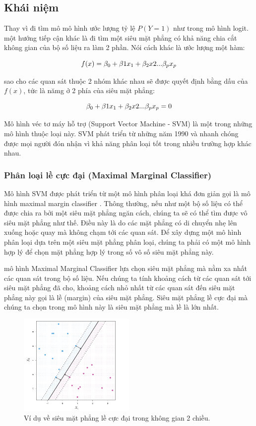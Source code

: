 \subsection{Khái niệm}
Thay vì đi tìm mô mô hình ước lượng tỷ lệ $P(Y =1)$ như trong mô hình logit. một hướng tiếp cận khác là đi tìm một siêu mặt phẳng có khả năng chia cắt không gian của bộ số liệu ra làm 2 phần. Nói cách khác là ước lượng một hàm:

$$
\large
f(x) = \beta_0 + \beta1 x_1 + \beta_2 x2 ...\beta_p x_p
$$

sao cho các quan sát thuộc 2 nhóm khác nhau sẽ được quyết định bằng dấu của $f(x)$, tức là nămg ở 2 phía của siêu mặt phẳng:

$$
\large
\beta_0 + \beta1 x_1 + \beta_2 x2 ...\beta_p x_p = 0
$$

Mô hình véc tơ máy hỗ trợ (Support Vector Machine - SVM) là một trong những mô hình thuộc loại này. SVM phát triển từ những năm 1990 và nhanh chóng được mọi người đón nhận vì khả năng phân loại tốt trong nhiều trường hợp khác nhau.

\subsubsection{Phân loại lề cực đại (Maximal Marginal Classifier)}
Mô hình SVM được phát triển từ một mô hình phân loại khá đơn giản gọi là mô hình maximal margin classifier \parencite{boser1992training}. Thông thường, nếu như một bộ số liệu có thể được chia ra bởi một siêu mặt phẳng ngăn cách, chúng ta sẽ có thể tìm được vô siêu mặt phẳng như thế. Điều này là do các mặt phẳng có di chuyển nhẹ lên xuống hoặc quay mà không chạm tới các quan sát. Để xây dựng một mô hình phân loại dựa trên một siêu mặt phẳng phân loại,  chúng ta phải có một mô hình hợp lý để chọn mặt phẳng hợp lý trong số vô số siêu mặt phẳng này.

mô hình Maximal Marginal Classifier lựa chọn siêu mặt phẳng mà nằm xa nhất các quan sát trong bộ số liệu. Nếu chúng ta tính khoảng cách từ các quan sát tới siêu mặt phẳng đã cho, khoảng cách nhỏ nhất từ các quan sát đến siêu mặt phẳng này gọi là lề (margin) của siêu mặt phẳng. Siêu mặt phẳng lề cực đại mà chúng ta chọn trong mô hình này là siêu mặt phẳng mà lề là lớn nhất.

\begin{figure}
  \centering
   \includegraphics[width=0.5\textwidth]{./Figures/maxim_margin_example.png}
   \caption{Ví dụ về siêu mặt phẳng lề cực đại trong không gian 2 chiều.}
   \label{fig:maxim_margin_example}
\end{figure}

